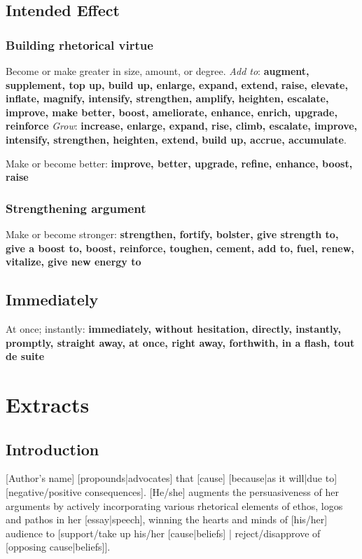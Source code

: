 \subsection{Intended Effect}
\subsubsection{Building rhetorical virtue}
Become or make greater in size, amount, or degree. \emph{Add to}: \textbf{augment, supplement, top up, build up, enlarge, expand, extend, raise, elevate, inflate,
magnify, intensify, strengthen, amplify, heighten, escalate,
improve, make better, boost, ameliorate, enhance, enrich, upgrade, reinforce}
\emph{Grow}: \textbf{increase, enlarge, expand, rise, climb, escalate, improve, intensify, strengthen, heighten, extend, build up, accrue, accumulate}. 

Make or become better: \textbf{improve, better, upgrade, refine, enhance, boost, raise}

\subsubsection{Strengthening argument}
Make or become stronger: \textbf{strengthen, fortify, bolster, give strength to, give a boost to, boost, reinforce, toughen, cement, add to, fuel, renew, vitalize, give new energy to}

\subsection{Immediately}
At once; instantly: \textbf{immediately, without hesitation, directly, instantly, promptly, straight away, at once, right away, forthwith, in a flash, tout de suite}

\section{Extracts}
\subsection{Introduction}
[Author's name] [propounds|advocates] that [cause] [because|as it will|due to] [negative/positive consequences]. [He/she] augments the persuasiveness of her arguments by actively incorporating various rhetorical elements of ethos, logos and pathos in her [essay|speech], winning the hearts and minds of [his/her] audience to [support/take up his/her [cause|beliefs] | reject/disapprove of [opposing cause|beliefs]].

